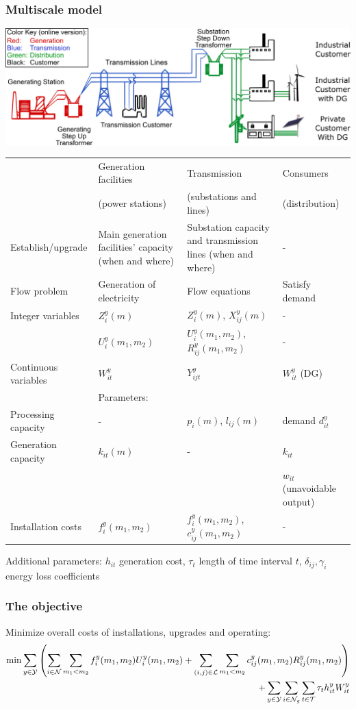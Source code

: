 \documentclass{beamer}
\newcommand{\NN}{\mathcal{N}}
\begin{document}
\begin{frame}
\frametitle{Multiscale model} %
\centering
\vspace{-0.25in}\includegraphics[width=.3\textwidth]{Aux_files/figure_1_Electricity_grid_simple_North_America.png}\vspace{0.1in}\\
\tiny
\begin{tabular}{lp{2.5cm}p{2.5cm}p{2cm}}
					& \textcolor{adired}{Generation facilities} & \textcolor{adiblue}{Transmission} & \textcolor{adigreen}{Consumers}\\
            		& \textcolor{adired}{(power stations)} & \textcolor{adiblue}{(substations and lines)} & \textcolor{adigreen}{(distribution)}\\\toprule\pause
Establish/upgrade 	& Main generation facilities' capacity (when and where)  & Substation capacity and transmission lines (when and where) & - \\\midrule\pause
Flow problem		& Generation of electricity				& Flow equations & Satisfy demand\\\midrule\pause
Integer variables	& $Z^y_i(m)$ & $Z^y_i(m)$, $X_{ij}^y(m)$ & - \\
					& $U_i^y(m_1,m_2)$ & $U_i^y(m_1,m_2)$, $R^y_{ij}(m_1,m_2)$ & -\\\midrule\pause
Continuous variables & $W_{it}^y$ & $Y^y_{ijt}$ & $W_{it}^y$ \quad (DG) \\\midrule\pause
                    & Parameters: & & \\\midrule
Processing capacity & - & $p_i(m)$, $l_{ij}(m)$ & demand $d_{it}^y$\\\midrule\pause
Generation capacity & $k_{it}(m)$ & - & $k_{it}$ \\
		            & & & $w_{it}$ (unavoidable output) \\\midrule\pause
Installation costs  & $f_i^y(m_1,m_2)$ & $f_i^y(m_1,m_2)$, $c_{ij}^y(m_1,m_2)$ & -\\\bottomrule
\end{tabular}\pause
\flushleft
Additional parameters: $h_{it}$ generation cost, $\tau_t$ length of time interval $t$, $\delta_{ij}, \gamma_i$ energy loss coefficients
\end{frame}

\begin{frame}
\frametitle{The objective}	
Minimize overall costs of installations, upgrades and operating:\scriptsize
\begin{align}
\min{\sum_{y\in\mathcal{Y}}\left(\sum_{i\in\NN}{\sum_{m_1<m_2}f_i^y(m_1,m_2)U_i^y(m_1,m_2)} + \sum_{(i,j)\in\mathcal{L}}\sum_{m_1<m_2}c_{ij}^y(m_1,m_2)R^y_{ij}(m_1,m_2) \right)\notag}\\
+ \sum_{y\in\mathcal{Y}}\sum_{i\in\NN_g}\sum_{t\in\mathcal{T}}\tau_th_{it}^yW_{it}^y\label{FND:objective}
\end{align}
\end{frame}
\end{document}
